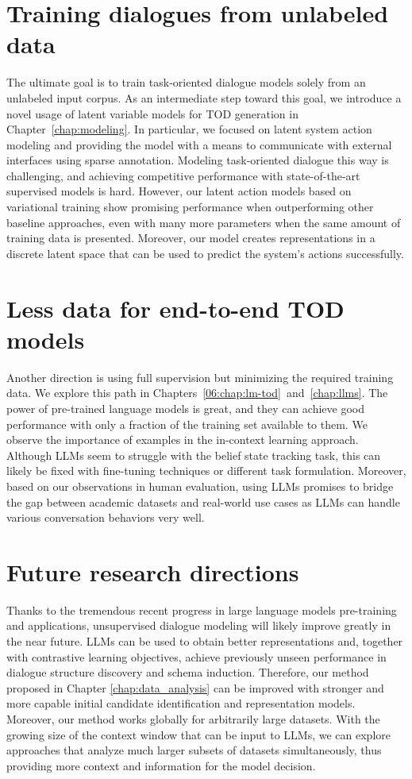 \section{Training dialogues from unlabeled data}
\label{08:sec:unsup}
The ultimate goal is to train task-oriented dialogue models solely from an unlabeled input corpus.
As an intermediate step toward this goal, we introduce a novel usage of latent variable models for TOD generation in Chapter~\ref{chap:modeling}.
In particular, we focused on latent system action modeling and providing the model with a means to communicate with external interfaces using sparse annotation.
Modeling task-oriented dialogue this way is challenging, and achieving competitive performance with state-of-the-art supervised models is hard.
However, our latent action models based on variational training show promising performance when outperforming other baseline approaches, even with many more parameters when the same amount of training data is presented.
Moreover, our model creates representations in a discrete latent space that can be used to predict the system's actions successfully.

\section{Less data for end-to-end TOD models}
\label{08:sec:less}
Another direction is using full supervision but minimizing the required training data.
We explore this path in Chapters~\ref{06:chap:lm-tod}~and~\ref{chap:llms}.
The power of pre-trained language models is great, and they can achieve good performance with only a fraction of the training set available to them.
We observe the importance of examples in the in-context learning approach.
Although LLMs seem to struggle with the belief state tracking task, this can likely be fixed with fine-tuning techniques or different task formulation.
Moreover, based on our observations in human evaluation, using LLMs promises to bridge the gap between academic datasets and real-world use cases as LLMs can handle various conversation behaviors very well.

\section{Future research directions}
\label{08:sec:future}
Thanks to the tremendous recent progress in large language models pre-training and applications, unsupervised dialogue modeling will likely improve greatly in the near future.
LLMs can be used to obtain better representations and, together with contrastive learning objectives, achieve previously unseen performance in dialogue structure discovery and schema induction.
Therefore, our method proposed in Chapter \ref{chap:data_analysis} can be improved with stronger and more capable initial candidate identification and representation models.
Moreover, our method works globally for arbitrarily large datasets.
With the growing size of the context window that can be input to LLMs, we can explore approaches that analyze much larger subsets of datasets simultaneously, thus providing more context and information for the model decision.

